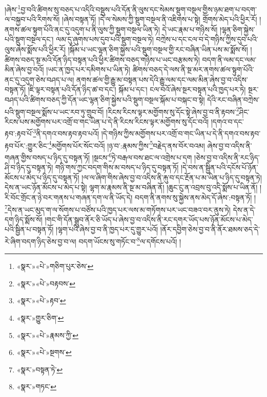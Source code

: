 །ཞེས་\footnote{«སྣར་»«པེ་»གཅིག་པུར་ཅེས་}བྱ་བའི་ཚིགས་སུ་བཅད་པ་འདིའི་བསྡུས་པའི་དོན་ནི་ལུས་དང་སེམས་སྡུག་བསྔལ་གྱིས་ཉམ་ཐག་པ་བདག་ལ་བསྐྱབ་པའི་རིགས་སོ། །ཞེས་བསྟན་ཏོ། །དེ་ལ་སེམས་ཀྱི་སྡུག་བསྔལ་ནི་འཇིགས་པ་སྟེ། གྲོགས་མེད་པའི་ཕྱིར་རོ། །ནགས་ཚལ་སྟུག་པོའི་ནང་དུ་འདུག་པ་ནི་ལུས་ཀྱི་སྡུག་བསྔལ་ཡིན་ཏེ། དེ་ཡང་རྣམ་པ་གཉིས་སོ། །ལྷན་ཅིག་སྐྱེས་པའི་སྡུག་བསྔལ་དང་། ལམ་དུ་ཞུགས་པས་དུབ་པའི་སྡུག་བསྔལ་ཏེ། བཀྲེས་པ་དང་ངལ་བ་དེ་གཉིས་ཀྱིས་དུབ་པའི་ལུས་ཞེས་སྨོས་པའི་ཕྱིར་རོ། །སྐོམ་པ་ཡང་ལྷན་ཅིག་སྐྱེས་པའི་སྡུག་བསྔལ་གྱི་རང་བཞིན་ཡིན་པས་མ་སྨོས་སོ། །ཚིགས་བཅད་སྔ་མའི་དོན་ཉིད་བསྟན་པའི་ཕྱིར་ཚིགས་བཅད་གཉིས་པ་ཡང་བརྩམས་ཏེ། བདག་ནི་ལམ་དང་ལམ་མིན་ཞེས་བྱ་བའོ། །ཡང་ན་ཁྱད་པར་དམིགས་པ་ཡིན་ཏེ། ཚིགས་བཅད་དེ་ལས་ནི་སྔ་མར་ནགས་ཚལ་སྟུག་པོའི་ནང་དུ་འདུག་ཅེས་བཤད་པ་ལ། ནགས་ཚལ་གྱི་རྒྱུ་མ་བསྟན་པས་དེའི་རྒྱུ་ལམ་དང་ལམ་མིན་ཞེས་བྱ་བ་འདིས་བསྟན་ཏོ། །ཇི་ལྟར་བསྟན་པའི་དོན་ཉིད་ཚ་བ་དང་། སྐོམ་པ་དང་། ངལ་བའོ་ཞེས་སྔར་བསྟན་པའི་ཁྱད་པར་ཏེ། སྔར་བཤད་པའི་ཚིགས་བཅད་ཀྱི་དོན་ཡང་ལྷན་ཅིག་སྐྱེས་པའི་སྡུག་བསྔལ་སྐོམ་པ་བསྐང་བ་སྟེ། དེའི་རང་བཞིན་བཀྲེས་པའི་སྡུག་བསྔལ་སྨོས་པ་ཡང་རབ་ཏུ་གྲུབ་བོ། །རིངས་རིངས་ལྟར་མགྱོགས་སུ་དོང་སྟེ་ཞེས་བྱ་བ་ནི་རྟབས་\footnote{«སྣར་»«པེ་»བརྟབས་}ཤིང་རིངས་པས་མགྱོགས་པར་འགྲོ་བ་གང་ཡིན་པ་དེ་ནི་རིངས་རིངས་ལྟར་མགྱོགས་སུ་དོང་བའོ། །དགའ་བ་དང་རྟབ་:རྟབ་པོ་\footnote{«སྣར་»«པེ་»རྟབ་}ནི་དགའ་བས་རྟབ་རྟབ་པའོ། །དེ་གཉིས་ཀྱིས་མགྱོགས་པར་འགྲོ་བ་གང་ཡིན་པ་དེ་ནི་དགའ་བས་རྟབ་རྟབ་པོར་:གྱུར་ཅིང་\footnote{«སྣར་»གྱུར་ཅིག་}མགྱོགས་པོར་སོང་བའོ། །ཉ་བ་:རྣམས་ཀྱིས་\footnote{«སྣར་»«པེ་»རྣམས་ཀྱི་}བརྗེད་ནས་བོར་བའམ། ཞེས་བྱ་བ་འདིས་ནི་གཞན་གྱིས་བསད་པ་ཉིད་དུ་བསྟན་ཏོ། །སྔངས་\footnote{«སྣར་»«པེ་»སྔགས་}ཏེ་བརྒལ་བས་ཐང་ལ་འགྲེས་པ་དག །ཅེས་བྱ་བ་འདིས་ནི་རང་ཉིད་ཤི་བ་ཉིད་དུ་བསྟན་ཏེ། གཉི་གས་ཀྱང་བདག་གིས་མ་བསད་པ་ཉིད་དུ་བསྟན་ཏོ། །དེ་བས་ན་སྦྱིན་པའི་དངོས་པོ་ཉོན་མོངས་པ་མེད་པ་ཉིད་དུ་བསྟན་ཏོ། །ལ་ལ་ཞིག་གིས་ཞེས་བྱ་བ་འདིས་ནི་རྐུ་བ་དང་རྔོན་པ་མ་ཡིན་པ་ཉིད་དུ་བསྟན་ཏེ། དེས་ན་ཡང་ཉོན་མོངས་པ་མེད་པ་སྟེ། ལྷག་མ་རྣམས་ནི་སྔ་མ་བཞིན་ནོ། །ཆུང་ངུ་ན་འབྲས་བུ་འདི་སྨོས་པ་ཡིན་ནོ། །རི་བོང་གྲོང་ན་ཉེ་བར་གནས་པ་གཞན་དག་ལ་ནི་ཡོད་དེ། བདག་ནི་ནགས་སུ་སྐྱེས་ནས་མེད་དོ་ཞེས་:བསྟན་ཏོ། །\footnote{«སྣར་»བསྟན་ཏེ་}དེས་ན་ཡང་མུད་ག་ལ་སོགས་པ་བཙོས་པའི་ཁྱད་པར་ལས་མ་གཏོགས་པར་ཡང་བཟའ་བར་ནུས་ཏེ། དེས་ན་དེ་དག་ཉིད་སྨོས་སོ། །གང་གི་དོན་སྒྲུབ་ནོར་ཅི་ཡོད་པ་ཞེས་བྱ་བ་འདིས་ནི་རང་དགར་ཡོད་པས་ཉོན་མོངས་པ་མེད་པའི་སྦྱིན་པ་བསྟན་ཏོ། །ལྷག་པའི་ཞེས་བྱ་བ་ནི་ཁྱད་པར་དུ་གྱུར་པའོ། །ནོར་དབྱིག་ཅེས་བྱ་བ་ནི་ནོར་ཐམས་ཅད་དེ་རེ་ཞིག་བདག་ཉིད་ཅེས་བྱ་བ་ལ། བདག་ཡོངས་སུ་གཏོང་བ་\footnote{«སྣར་»གཏང་}ལ་དགོངས་པའོ། །
